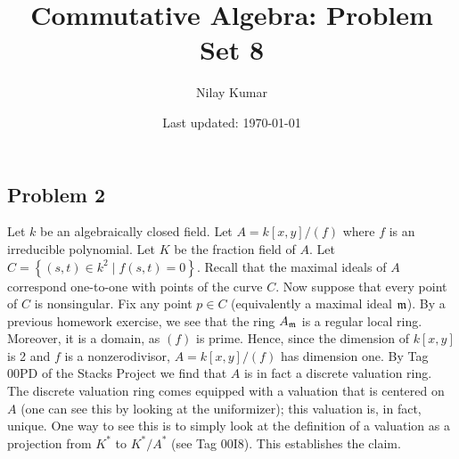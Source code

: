 \documentclass{../../mathnotes}
\title{Commutative Algebra: Problem Set 8}
\author{Nilay Kumar}
\date{Last updated: \today}
\begin{document}
\maketitle

\subsection*{Problem 2}

Let $k$ be an algebraically closed field. Let $A=k[x,y]/(f)$ where $f$ is an irreducible polynomial. Let $K$ be
the fraction field of $A$. Let $C=\left\{ (s,t)\in k^2\mid f(s,t)=0 \right\}.$ Recall that the maximal ideals of
$A$ correspond one-to-one with points of the curve $C$. Now suppose that every point of $C$ is nonsingular. Fix any
point $p\in C$ (equivalently a maximal ideal $\mathfrak m$). By a previous homework exercise, we see that the ring $A_\mathfrak m$
is a regular local ring. Moreover, it is a domain, as $(f)$ is prime. Hence, since the dimension of $k[x,y]$ is 2 and $f$
is a nonzerodivisor, $A=k[x,y]/(f)$ has dimension one. By Tag 00PD of the Stacks Project we find that $A$ is in fact
a discrete valuation ring. The discrete valuation ring comes equipped with a valuation that is centered on $A$ (one can
see this by looking at the uniformizer); this valuation is, in fact, unique. One way to see this is to simply look at the definition
of a valuation as a projection from $K^*$ to $K^*/A^*$ (see Tag 00I8). This establishes the claim.
\end{document}
